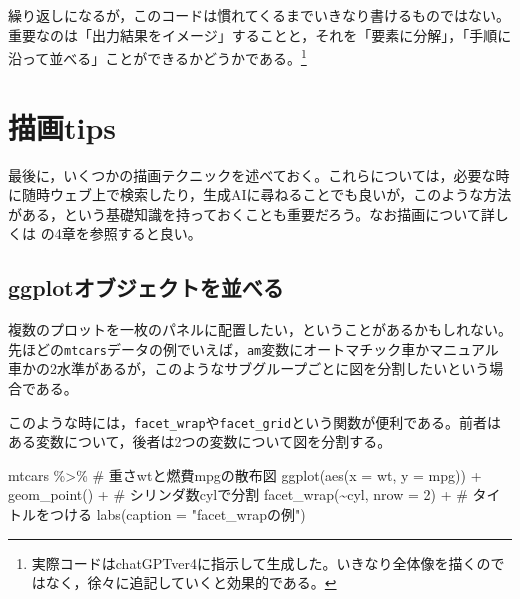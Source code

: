 \documentclass[
  a4paper,
]{ltjsbook}
\newenvironment{Shaded}{\begin{snugshade}}{\end{snugshade}}
\newcommand{\AttributeTok}[1]{\textcolor[rgb]{0.40,0.45,0.13}{#1}}
\newcommand{\CommentTok}[1]{\textcolor[rgb]{0.37,0.37,0.37}{#1}}
\newcommand{\DecValTok}[1]{\textcolor[rgb]{0.68,0.00,0.00}{#1}}
\newcommand{\FunctionTok}[1]{\textcolor[rgb]{0.28,0.35,0.67}{#1}}
\newcommand{\NormalTok}[1]{\textcolor[rgb]{0.00,0.23,0.31}{#1}}
\newcommand{\SpecialCharTok}[1]{\textcolor[rgb]{0.37,0.37,0.37}{#1}}
\newcommand{\StringTok}[1]{\textcolor[rgb]{0.13,0.47,0.30}{#1}}
\begin{document}
繰り返しになるが，このコードは慣れてくるまでいきなり書けるものではない。重要なのは「出力結果をイメージ」することと，それを「要素に分解」，「手順に沿って並べる」ことができるかどうかである。\footnote{実際コードはchatGPTver4に指示して生成した。いきなり全体像を描くのではなく，徐々に追記していくと効果的である。}

\section{描画tips}\label{ux63cfux753btips}

最後に，いくつかの描画テクニックを述べておく。これらについては，必要な時に随時ウェブ上で検索したり，生成AIに尋ねることでも良いが，このような方法がある，という基礎知識を持っておくことも重要だろう。なお描画について詳しくは
\textcite{Kinosady2021} の4章を参照すると良い。

\subsection{ggplotオブジェクトを並べる}\label{ggplotux30aaux30d6ux30b8ux30a7ux30afux30c8ux3092ux4e26ux3079ux308b}

複数のプロットを一枚のパネルに配置したい，ということがあるかもしれない。先ほどの\texttt{mtcars}データの例でいえば，\texttt{am}変数にオートマチック車かマニュアル車かの2水準があるが，このようなサブグループごとに図を分割したいという場合である。

このような時には，\texttt{facet\_wrap}や\texttt{facet\_grid}という関数が便利である。前者はある変数について，後者は2つの変数について図を分割する。

\begin{Shaded}
\begin{Highlighting}[]
\NormalTok{mtcars }\SpecialCharTok{\%\textgreater{}\%}
  \CommentTok{\# 重さwtと燃費mpgの散布図}
  \FunctionTok{ggplot}\NormalTok{(}\FunctionTok{aes}\NormalTok{(}\AttributeTok{x =}\NormalTok{ wt, }\AttributeTok{y =}\NormalTok{ mpg)) }\SpecialCharTok{+}
  \FunctionTok{geom\_point}\NormalTok{() }\SpecialCharTok{+}
  \CommentTok{\# シリンダ数cylで分割}
  \FunctionTok{facet\_wrap}\NormalTok{(}\SpecialCharTok{\textasciitilde{}}\NormalTok{cyl, }\AttributeTok{nrow =} \DecValTok{2}\NormalTok{) }\SpecialCharTok{+}
  \CommentTok{\# タイトルをつける}
  \FunctionTok{labs}\NormalTok{(}\AttributeTok{caption =} \StringTok{"facet\_wrapの例"}\NormalTok{)}
\end{Highlighting}
\end{Shaded}
\end{document}
